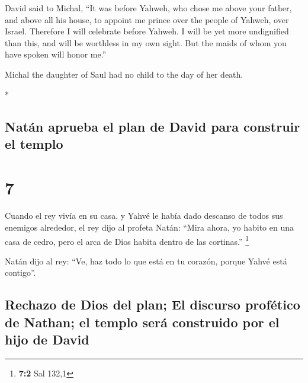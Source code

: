 \begin{paracol}{2}
\begin{otherlanguage}{english}
 David said to Michal, ``It was before Yahweh, who chose
me above your father, and above all his house, to appoint me prince over
the people of Yahweh, over Israel. Therefore I will celebrate before
Yahweh.  I will be yet more undignified than this, and
will be worthless in my own sight. But the maids of whom you have spoken
will honor me.''

 Michal the daughter of Saul had no child to the day of
her death.

\end{otherlanguage}

\switchcolumn[0]*

\hypertarget{natuxe1n-aprueba-el-plan-de-david-para-construir-el-templo}{%
\subsection{Natán aprueba el plan de David para construir el
templo}\label{natuxe1n-aprueba-el-plan-de-david-para-construir-el-templo}}

\hypertarget{section-12}{%
\section{7}\label{section-12}}

 Cuando el rey vivía en su casa, y Yahvé le había dado
descanso de todos sus enemigos alrededor,  el rey dijo al
profeta Natán: ``Mira ahora, yo habito en una casa de cedro, pero el
arca de Dios habita dentro de las cortinas.'' \footnote{\textbf{7:2} Sal
  132,1}

 Natán dijo al rey: ``Ve, haz todo lo que está en tu
corazón, porque Yahvé está contigo''.

\hypertarget{rechazo-de-dios-del-plan-el-discurso-profuxe9tico-de-nathan-el-templo-seruxe1-construido-por-el-hijo-de-david}{%
\subsection{Rechazo de Dios del plan; El discurso profético de Nathan;
el templo será construido por el hijo de
David}\label{rechazo-de-dios-del-plan-el-discurso-profuxe9tico-de-nathan-el-templo-seruxe1-construido-por-el-hijo-de-david}}


\end{paracol}

